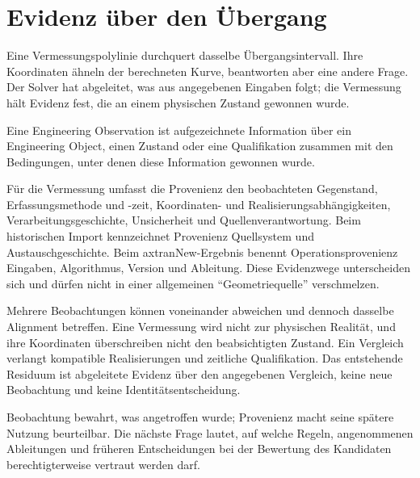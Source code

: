 
\chapter{Evidenz über den Übergang}
\label{chap:engineering-observations}

Eine Vermessungspolylinie durchquert dasselbe Übergangsintervall. Ihre
Koordinaten ähneln der berechneten Kurve, beantworten aber eine andere Frage.
Der Solver hat abgeleitet, was aus angegebenen Eingaben folgt; die Vermessung
hält Evidenz fest, die an einem physischen Zustand gewonnen wurde.

\begin{definition}
\label{def:engineering-observation}
Eine Engineering Observation ist aufgezeichnete Information über ein
Engineering Object, einen Zustand oder eine Qualifikation zusammen mit den
Bedingungen, unter denen diese Information gewonnen wurde.
\end{definition}

Für die Vermessung umfasst die Provenienz den beobachteten Gegenstand,
Erfassungsmethode und -zeit, Koordinaten- und Realisierungsabhängigkeiten,
Verarbeitungsgeschichte, Unsicherheit und Quellenverantwortung. Beim
historischen Import kennzeichnet Provenienz Quellsystem und Austauschgeschichte.
Beim axtranNew-Ergebnis benennt Operationsprovenienz Eingaben, Algorithmus,
Version und Ableitung. Diese Evidenzwege unterscheiden sich und dürfen nicht in
einer allgemeinen ``Geometriequelle'' verschmelzen.

Mehrere Beobachtungen können voneinander abweichen und dennoch dasselbe
Alignment betreffen. Eine Vermessung wird nicht zur physischen Realität, und
ihre Koordinaten überschreiben nicht den beabsichtigten Zustand. Ein Vergleich
verlangt kompatible Realisierungen und zeitliche Qualifikation. Das entstehende
Residuum ist abgeleitete Evidenz über den angegebenen Vergleich, keine neue
Beobachtung und keine Identitätsentscheidung.

Beobachtung bewahrt, was angetroffen wurde; Provenienz macht seine spätere
Nutzung beurteilbar. Die nächste Frage lautet, auf welche Regeln, angenommenen
Ableitungen und früheren Entscheidungen bei der Bewertung des Kandidaten
berechtigterweise vertraut werden darf.
